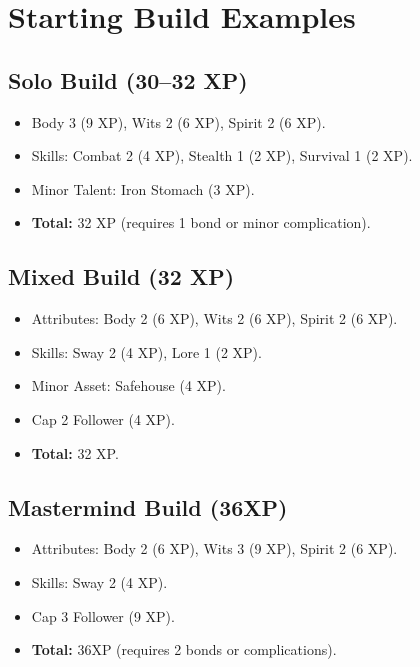 \section{Starting Build Examples}\label{sec:starting_examples}

\subsection{Solo Build (30--32 XP)}\label{subsec:solo_example}

\begin{itemize}
    \item Body 3 (9 XP), Wits 2 (6 XP), Spirit 2 (6 XP).
    \item Skills: Combat 2 (4 XP), Stealth 1 (2 XP), Survival 1 (2 XP).
    \item Minor Talent: Iron Stomach (3 XP).
    \item \textbf{Total:} 32 XP (requires 1 bond or minor complication).
\end{itemize}

\subsection{Mixed Build (32 XP)}\label{subsec:mixed_example}

\begin{itemize}
    \item Attributes: Body 2 (6 XP), Wits 2 (6 XP), Spirit 2 (6 XP).
    \item Skills: Sway 2 (4 XP), Lore 1 (2 XP).
    \item Minor Asset: Safehouse (4 XP).
    \item Cap 2 Follower (4 XP).
    \item \textbf{Total:} 32 XP.
\end{itemize}

\subsection{Mastermind Build (36XP)}\label{subsec:mastermind_example}

\begin{itemize}
    \item Attributes: Body 2 (6 XP), Wits 3 (9 XP), Spirit 2 (6 XP).
    \item Skills: Sway 2 (4 XP).
    \item Cap 3 Follower (9 XP).
    \item \textbf{Total:} 36XP (requires 2 bonds or complications).
\end{itemize}

